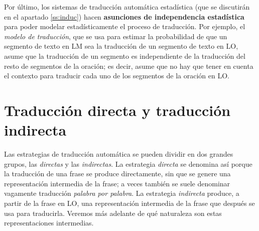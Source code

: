 Por último, los sistemas de traducción automática estadística (que se discutirán en el apartado \ref{ss:induc}) hacen \textbf{asunciones de independencia estadística} para poder modelar estadísticamente el proceso de traducción. Por ejemplo, el \emph{modelo de traducción}, que se usa para estimar la probabilidad de que un segmento de texto en LM sea la traducción de un segmento de texto en LO, asume que la traducción de un segmento es independiente de la traducción del resto de segmentos de la oración; es decir, asume que no hay que tener en cuenta el contexto para traducir cada uno de los segmentos de la oración en LO. 

\section{Traducción directa y traducción indirecta} \label{ss:dirindir} Las estrategias de traducción automática se pueden dividir en dos grandes grupos, las \emph{directas} y las \emph{indirectas}. La estrategia \emph{directa} se denomina así porque la traducción de una frase se produce directamente, sin que se genere una representación intermedia de la frase; a veces también se suele denominar vagamente traducción \emph{palabra por palabra}. La estrategia \emph{indirecta} produce, a partir de la frase en LO, una representación intermedia de la frase que después se usa para traducirla. Veremos más adelante de qué naturaleza son estas representaciones intermedias. 

